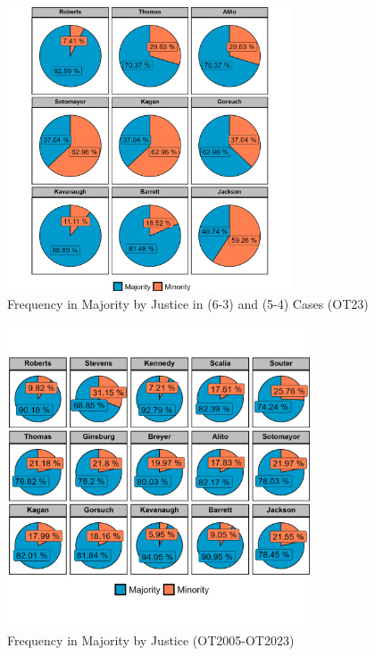 \begin{landscape}
\begin{figure}[H]
\centering
\caption{Frequency in Majority by Justice in (6-3) and (5-4) Cases (OT23)}
\vspace{2.5mm}
\includegraphics[width = 0.75\textwidth]{Figures/statpack_figures/percent_majority_split_cases.png}
\end{figure}

\newpage

\begin{figure}[H]
\centering
\caption{Frequency in Majority by Justice (OT2005-OT2023)}
\includegraphics[width = 0.8\textwidth]{Figures/statpack_figures/percent_majority_justice.png}
\end{figure}
\end{landscape}

